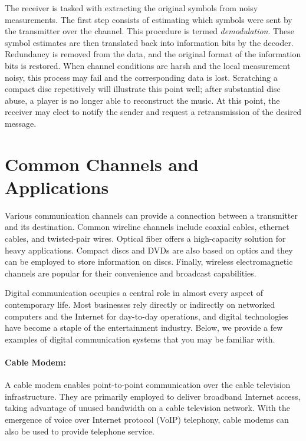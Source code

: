The receiver is tasked with extracting the original symbols from noisy measurements.
The first step consists of estimating which symbols were sent by the transmitter over the channel.
This procedure is termed \emph{demodulation}.
These symbol estimates are then translated back into information bits by the decoder.
Redundancy is removed from the data, and the original format of the information bits is restored.
When channel conditions are harsh and the local measurement noisy, this process may fail and the corresponding data is lost.
Scratching a compact disc repetitively will illustrate this point well;
after substantial disc abuse, a player is no longer able to reconstruct the music.
At this point, the receiver may elect to notify the sender and request a retransmission of the desired message.


\section{Common Channels and Applications}

Various communication channels can provide a connection between a transmitter and its destination.
Common wireline channels include coaxial cables, ethernet cables, and twisted-pair wires.
Optical fiber offers a high-capacity solution for heavy applications.
Compact discs and DVDs are also based on optics and they can be employed to store information on discs.
Finally, wireless electromagnetic channels are popular for their convenience and broadcast capabilities.

Digital communication occupies a central role in almost every aspect of contemporary life.
Most businesses rely directly or indirectly on networked computers and the Internet for day-to-day operations, and digital technologies have become a staple of the entertainment industry.
Below, we provide a few examples of digital communication systems that you may be familiar with.

\paragraph{Cable Modem:}
A cable modem enables point-to-point communication over the cable television infrastructure.
They are primarily employed to deliver broadband Internet access, taking advantage of unused bandwidth on a cable television network.
With the emergence of voice over Internet protocol (VoIP) telephony, cable modems can also be used to provide telephone service.

